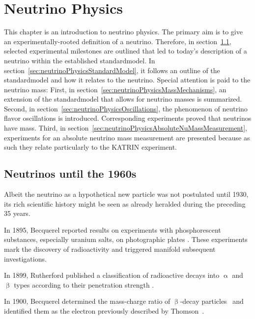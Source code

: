 \def\currentRootFolder{chapter/neutrinoPhysics}
\def\currentFigureFolder{\currentRootFolder/fig}

\chapter{Neutrino Physics}
\label{sec:neutrinoPhysics}
This chapter is an introduction to neutrino physics. The primary aim is to give an experimentally-rooted definition of a neutrino. Therefore, in section~\ref{sec:neutrinoPhysicsHistory}, selected experimental milestones are outlined that led to today's description of a neutrino within the established \gls{standardmodel}. In section~\ref{sec:neutrinoPhysicsStandardModel}, it follows an outline of the \gls{standardmodel} and how it relates to the neutrino. Special attention is paid to the neutrino mass: First, in section~\ref{sec:neutrinoPhysicsMassMechanisms}, an extension of the \gls{standardmodel} that allows for neutrino masses is summarized. Second, in section~\ref{sec:neutrinoPhysicsOscillations}, the phenomenon of neutrino flavor oscillations is introduced. Corresponding experiments proved that neutrinos have mass. Third, in section~\ref{sec:neutrinoPhysicsAbsoluteNuMassMeasurement}, experiments for an absolute neutrino mass measurement are presented because as such they relate particularly to the KATRIN experiment.

\section{Neutrinos until the 1960s}
\label{sec:neutrinoPhysicsHistory}
Albeit the neutrino as a hypothetical new particle was not postulated until 1930, its rich scientific history might be seen as already heralded during the preceding 35 years. 

In 1895, Becquerel reported results on experiments with phosphorescent substances, especially uranium salts, on photographic plates \cite{Becquerel:1}. These experiments mark the discovery of radioactivity and triggered manifold subsequent investigations. 

In 1899, Rutherford published a classification of radioactive decays into $\upalpha$ and $\upbeta$ types according to their penetration strength \cite{Rutherford:1}. 

In 1900, Becquerel determined the mass-charge ratio of $\upbeta$-decay particles~\cite{Becquerel:2} and identified them as the electron previously described by Thomson~\cite{Thomson:1}. 

